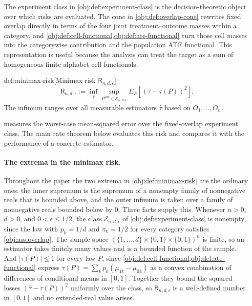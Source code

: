 The experiment class in \cref{obj:def:experiment-class} is the decision-theoretic object over which risks are evaluated. The cone in \cref{obj:def:overlap-cone} rewrites fixed overlap directly in terms of the four joint treatment--outcome masses within a category, and \cref{obj:def:cell-functional,obj:def:ate-functional} turn those cell masses into the categorywise contribution and the population ATE functional. This representation is useful because the analysis can treat the target as a sum of homogeneous finite-alphabet cell functionals.

\begin{definitionv}{def:minimax-risk}[Minimax risk \(\mathsf R_{n,d,\epsilon}\)]
\[
\mathsf R_{n,d,\epsilon}
:=
\inf_{\widehat\tau}
\sup_{P^{\otimes n}\in\mathcal E_{n,d,\epsilon}}
E_P\!\left[(\widehat\tau-\tau(P))^2\right].
\]
The infimum ranges over all measurable estimators \(\widehat\tau\) based on \(O_1,\ldots,O_n\).
\end{definitionv}

 measures the worst-case mean-squared error over the fixed-overlap experiment class. The main rate theorem below evaluates this risk and compares it with the performance of a concrete estimator.

\paragraph{The extrema in the minimax risk.}
Throughout the paper the two extrema in \cref{obj:def:minimax-risk} are the ordinary ones: the inner supremum is the supremum of a nonempty family of nonnegative reals that is bounded above, and the outer infimum is taken over a family of nonnegative reals bounded below by \(0\). Three facts supply this. Whenever \(n>0\), \(d>0\), and \(0<\epsilon\le1/2\), the class \(\mathcal E_{n,d,\epsilon}\) of \cref{obj:def:experiment-class} is nonempty, since the law with \(p_k=1/d\) and \(\pi_k=1/2\) for every category satisfies \cref{obj:ass:overlap}. The sample space \((\{1,\ldots,d\}\times\{0,1\}\times\{0,1\})^n\) is finite, so an estimator takes finitely many values and is a bounded function of the sample. And \(|\tau(P)|\le1\) for every law \(P\), since \cref{obj:def:cell-functional,obj:def:ate-functional} express \(\tau(P)=\sum_kp_k(\mu_{1k}-\mu_{0k})\) as a convex combination of differences of conditional means in \([0,1]\). Together they bound the squared losses \((\widehat\tau-\tau(P))^2\) uniformly over the class, so \(\mathsf R_{n,d,\epsilon}\) is a well-defined number in \([0,1]\) and no extended-real value arises.

